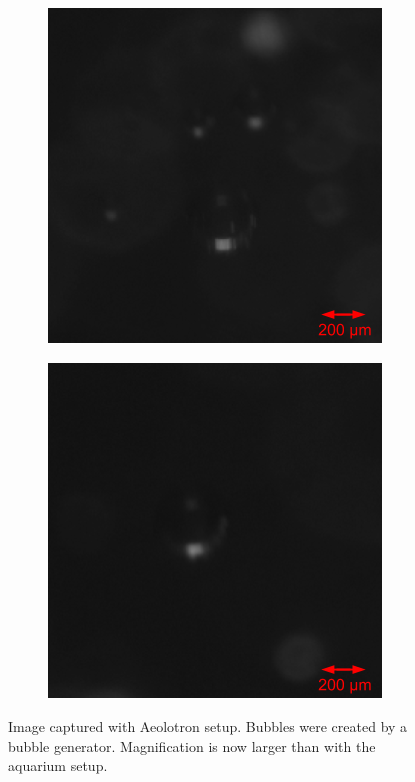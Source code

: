 			\begin{figure}
				\begin{subfigure}[t]{.55\textwidth}
				\centering
				\includegraphics[scale=0.5]{images/aeolotron_result_small_1.png}
				\caption{}
				\label{subfig:aquarium_result_sat}
			\end{subfigure}\hfill
			\begin{subfigure}[t]{.55\textwidth}
				\centering
				\includegraphics[scale=0.5]{images/aeolotron_result_small_2.png}
				\caption{}
			\end{subfigure}
				\caption{Image captured with Aeolotron setup. Bubbles were created by a bubble generator. Magnification is now larger than with the aquarium setup.}
								
				\label{fig:aeolotron_result}
			\end{figure}

